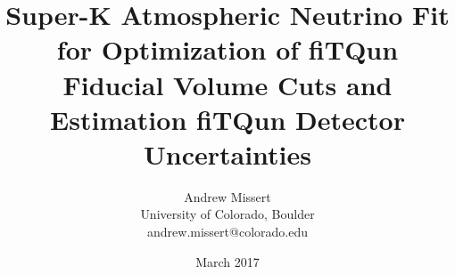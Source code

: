\documentclass[12pt]{article}
\begin{document}
\title{Super-K Atmospheric Neutrino Fit for Optimization of fiTQun Fiducial
Volume Cuts and Estimation fiTQun Detector Uncertainties}
\author{Andrew Missert\\University of Colorado, Boulder\\andrew.missert@colorado.edu}
\date{March 2017}
\maketitle















\appendix




{}




\end{document}

